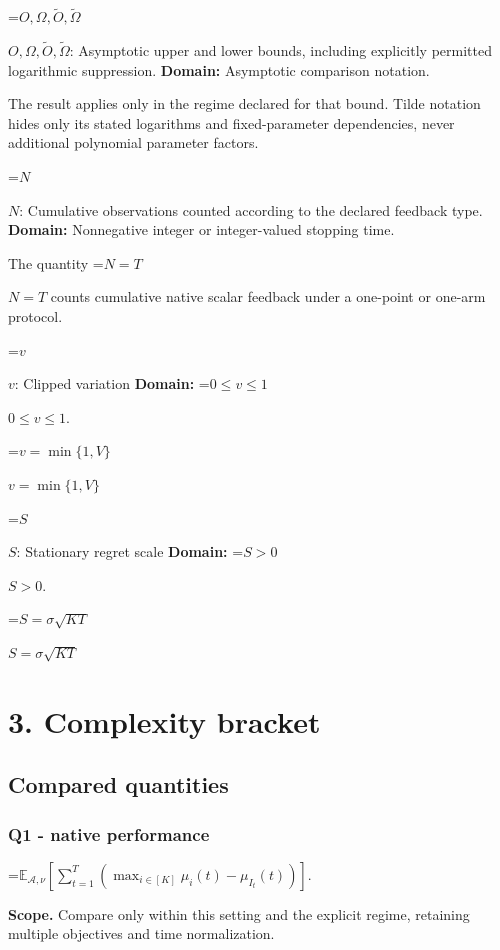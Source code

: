 \documentclass[10pt,a4paper]{article}
\newcommand{\AtlasMath}[1]{\par\begingroup\centering\setbox0=\hbox{$\displaystyle #1$}\ifdim\wd0>1.4\linewidth\typeout{ATLAS WIDE FORMULA: \the\wd0}\fi\ifdim\wd0>\linewidth\resizebox{\linewidth}{!}{\box0}\else\box0\fi\par\endgroup}
\newcommand{\AtlasInlineMath}[1]{\begingroup\setbox0=\hbox{$#1$}\ifdim\wd0>.4\linewidth\endgroup\AtlasMath{#1}\else\endgroup$#1$\fi}
\begin{document}
\AtlasInlineMath{O,\Omega,\widetilde O,\widetilde\Omega}: Asymptotic upper and lower bounds, including explicitly permitted logarithmic suppression. \textbf{Domain:} Asymptotic comparison notation.



The result applies only in the regime declared for that bound. Tilde notation hides only its stated logarithms and fixed-parameter dependencies, never additional polynomial parameter factors.



\AtlasInlineMath{N}: Cumulative observations counted according to the declared feedback type. \textbf{Domain:} Nonnegative integer or integer-valued stopping time.



The quantity \AtlasInlineMath{N=T} counts cumulative native scalar feedback under a one-point or one-arm protocol.



\AtlasInlineMath{v}: Clipped variation \textbf{Domain:} \AtlasInlineMath{0\le v\le1}.



\AtlasInlineMath{v=\min\{1,V\}}



\AtlasInlineMath{S}: Stationary regret scale \textbf{Domain:} \AtlasInlineMath{S>0}.



\AtlasInlineMath{S=\sigma\sqrt{KT}}



\section{3. Complexity bracket}


\subsection{Compared quantities}


\subsubsection{Q1 - native performance}


\AtlasMath{\mathbb E_{\mathcal A,\nu}\!\left[\sum_{t=1}^{T}\left(\max_{i\in[K]}\mu_i(t)-\mu_{I_t}(t)\right)\right].}


\textbf{Scope.} Compare only within this setting and the explicit regime, retaining multiple objectives and time normalization.
\end{document}
